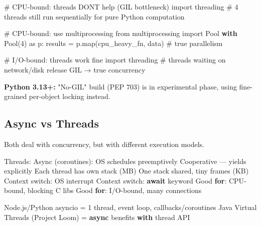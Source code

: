 \documentclass[11pt]{article}
\newenvironment{Shaded}{\begin{snugshade}}{\end{snugshade}}
\newcommand{\BuiltInTok}[1]{\textcolor[rgb]{0.50,0.55,0.55}{#1}}
\newcommand{\CommentTok}[1]{\textcolor[rgb]{0.48,0.49,0.49}{#1}}
\newcommand{\ControlFlowTok}[1]{\textcolor[rgb]{0.99,0.74,0.29}{\textbf{#1}}}
\newcommand{\DecValTok}[1]{\textcolor[rgb]{0.96,0.45,0.00}{#1}}
\newcommand{\ImportTok}[1]{\textcolor[rgb]{0.15,0.68,0.38}{#1}}
\newcommand{\NormalTok}[1]{\textcolor[rgb]{0.81,0.81,0.76}{#1}}
\newcommand{\OperatorTok}[1]{\textcolor[rgb]{0.81,0.81,0.76}{#1}}
\begin{document}

\begin{Shaded}
\begin{Highlighting}[]
\CommentTok{\# CPU{-}bound: threads DON\textquotesingle{}T help (GIL bottleneck)}
\ImportTok{import}\NormalTok{ threading}
\CommentTok{\# 4 threads still run sequentially for pure Python computation}

\CommentTok{\# CPU{-}bound: use multiprocessing}
\ImportTok{from}\NormalTok{ multiprocessing }\ImportTok{import}\NormalTok{ Pool}
\ControlFlowTok{with}\NormalTok{ Pool(}\DecValTok{4}\NormalTok{) }\ImportTok{as}\NormalTok{ p:}
\NormalTok{    results }\OperatorTok{=}\NormalTok{ p.}\BuiltInTok{map}\NormalTok{(cpu\_heavy\_fn, data)  }\CommentTok{\# true parallelism}

\CommentTok{\# I/O{-}bound: threads work fine}
\ImportTok{import}\NormalTok{ threading}
\CommentTok{\# threads waiting on network/disk release GIL → true concurrency}
\end{Highlighting}
\end{Shaded}

\textbf{Python 3.13+:} "No-GIL" build (PEP 703) is in experimental phase, using fine-grained per-object locking instead.

\subsection{Async vs Threads}\label{async-vs-threads}

Both deal with concurrency, but with different execution models.


\begin{Shaded}
\begin{Highlighting}[]
\NormalTok{Threads:                              Async (coroutines):}
\NormalTok{OS schedules preemptively             Cooperative — yields explicitly}
\NormalTok{Each thread has own stack (MB)        One stack shared, tiny frames (KB)}
\NormalTok{Context switch: OS interrupt          Context switch: }\ControlFlowTok{await}\NormalTok{ keyword}
\NormalTok{Good }\ControlFlowTok{for}\NormalTok{: CPU}\OperatorTok{{-}}\NormalTok{bound, blocking C libs  Good }\ControlFlowTok{for}\NormalTok{: I}\OperatorTok{/}\NormalTok{O}\OperatorTok{{-}}\NormalTok{bound, many connections}

\NormalTok{Node.js}\OperatorTok{/}\NormalTok{Python asyncio }\OperatorTok{=} \DecValTok{1}\NormalTok{ thread, event loop, callbacks}\OperatorTok{/}\NormalTok{coroutines}
\NormalTok{Java Virtual Threads (Project Loom) }\OperatorTok{=} \ControlFlowTok{async}\NormalTok{ benefits }\ControlFlowTok{with}\NormalTok{ thread API}
\end{Highlighting}
\end{Shaded}
\end{document}
